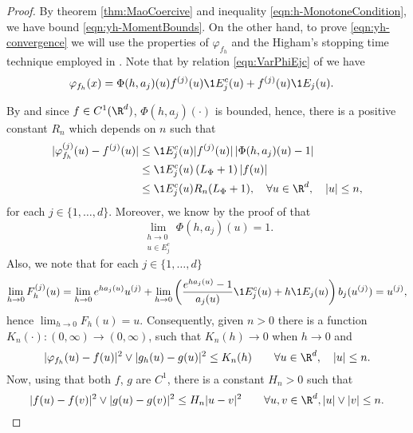 \begin{proof}
	By theorem \ref{thm:MaoCoercive} and inequality \eqref{eqn:h-MonotoneCondition}, 
	we have	 bound \eqref{eqn:yh-MomentBounds}.
	On the other hand, to prove \eqref{eqn:yh-convergence} we will use the properties of 
	$\varphi_{f_h}$ and the Higham's stopping time technique employed in \cite[Thm 2.2]{Higham2002b}. 
	Note that by relation \eqref{eqn:VarPhiEjc} of  we have 
	\begin{align*}
		\varphi_{f_h}(x) 
			&= \Phi(h,a_j)(u) f^{(j)}(u) \1{E_j^c}(u) 
				+ f^{(j)}(u) \1{E_j}(u).
	\end{align*}
	
	By   and since $f \in C^1(\R^d)$,   $\Phi(h,a_j)(\cdot)$ is bounded,
	hence, there is a positive constant $R_n$ which depends on $n$ such that 
	\begin{align*}	
		|\varphi_{f_h}^{(j)}(u) - f^{(j)}(u)|
		&\leq
			\1{E_j^c}(u)
			|f^{(j)}(u)|
			\left|
				\Phi(h,a_j)(u) - 1
			\right| \notag \\
		&\leq
			\1{E_j^c}(u)
			\left(
				L_{\Phi} + 1
			\right)
			|f(u)|	 \notag \\
		&\leq
		\1{E_j^c}(u) R_n(L_{\Phi}+1), \quad \forall u \in \R^d, \quad |u|\leq n,
	\end{align*}
	for each $j\in \{1,\dots, d\}$. 
	Moreover, we know by the proof of  that
	\begin{equation*}
	 \lim_{
	 	\substack{
		 	h\to 0 \\
		 	u\in E_j^c	
	 	}
	 }
	 \Phi(h,a_j)(u) = 1.	 	
	\end{equation*}
	Also, we note that for each $j \in \{1, \dots , d\}$
	\begin{equation*}
	\lim_{h \to 0} F_h^{(j)}(u)
		=
		\lim_{h \to 0}
			e^{ha_j(u)} u^{(j)} + 
		\lim_{h \to 0}
			\left(
				\frac{e^{ha_j(u)}-1}{a_j(u)}
				\1{E_j^c}(u)
				+h \1{E_j}(u)
			\right)
			b_j(u^{(j)}) 
		= u^{(j)},
	\end{equation*}
	hence
	$%
		\displaystyle
		\lim_{h\to 0} F_h(u)=u.
	$ %
	Consequently, given $n>0$ there is  a function $K_n(\cdot):(0,\infty)\to (0,\infty)$, such that
	$K_n(h)\to 0$ when $h \to 0$ and
	\begin{equation}\label{eqn:PhihGhKRhBound}
		|\varphi_{f_h}(u)-f(u)|^2 \vee |g_h(u)-g(u)|^2
		\leq K_n(h) \qquad \forall u\in \R^d, \quad |u| \leq n.
	\end{equation}
	Now, using that both $f$, $g$ are $C^{1}$, there is  a constant $H_n>0$ such that
	\begin{equation}\label{eqn:f-gHRBound}
		|f(u)-f(v)|^2 \vee |g(u)-g(v)|^2
		\leq H_n |u-v|^2\qquad \forall u,v \in \R^d, |u|\vee |v| \leq n.
	\end{equation}
	

\end{proof}
